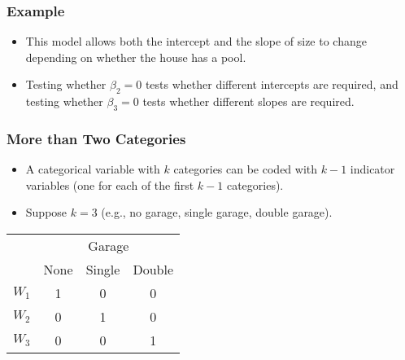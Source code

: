 \documentclass[14pt]{beamer}
\begin{document}
\begin{frame}
	\frametitle{Example}
	
	\begin{itemize}[label={\color{blue}$\blacktriangleright$}]
		\item This model allows both the intercept and the slope of size to change depending on whether the house has a pool.
		
		\item Testing whether $\beta_2 = 0$ tests whether different intercepts are required, and testing whether $\beta_3 = 0$ tests whether different slopes are required.
	\end{itemize}
	
\end{frame}
\begin{frame}
	\frametitle{More than Two Categories}
	
	\begin{itemize}[label={\color{blue}$\blacktriangleright$}]
		\item A categorical variable with $k$ categories can be coded with $k-1$ indicator variables (one for each of the first $k-1$ categories).
		
		\item Suppose $k = 3$ (e.g., no garage, single garage, double garage).
	\end{itemize}
	
	\begin{center}
		\begin{tabular}{cccc}
			\toprule
			& \multicolumn{3}{c}{Garage} \\
			\cline{2-4}
			& None & Single & Double \\
			\midrule
			$W_1$ & 1 & 0 & 0 \\
			$W_2$ & 0 & 1 & 0 \\
			$W_3$ & 0 & 0 & 1 \\
			\bottomrule
		\end{tabular}
	\end{center}
	
\end{frame}
\end{document}
